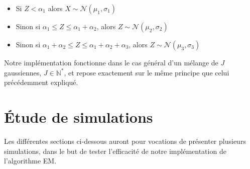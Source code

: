 \documentclass[frenchb]{report}
\newcommand{\1}{\mathbbm{1}}
\theoremstyle{definition}\newtheorem{defn}{Définition}
\theoremstyle{definition}\newtheorem{exm}{Exemple}
\theoremstyle{definition}\newtheorem{nota}{Notation}
\theoremstyle{definition}\newtheorem{rem}{Remarque}
\begin{document}
\begin{itemize}
	\item Si $Z < \alpha_1$ alors $X \sim \mathcal{N}(\mu_1, \sigma_1)$ \\
	\item Sinon si $\alpha_1 \leq Z \leq \alpha_1 + \alpha_2$, alors $Z \sim \mathcal{N}(\mu_2, \sigma_2)$ \\
	\item Sinon si  $\alpha_1 + \alpha_2 \leq Z \leq \alpha_1 + \alpha_2 + \alpha_3$, alors $Z \sim \mathcal{N}(\mu_3, \sigma_3)$
\end{itemize}
Notre implémentation fonctionne dans le cas général d'un mélange de $J$ gaussiennes, $J \in \mathbb{N^*}$, et repose exactement sur le même principe que celui précédemment expliqué.



\section{Étude de simulations}
Les différentes sections ci-dessous auront pour vocations de présenter plusieurs simulations, dans le but de tester l'efficacité de notre implémentation de l'algorithme EM.
\end{document}
